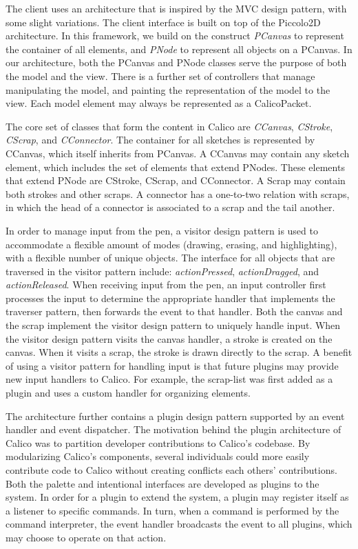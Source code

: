 \documentclass[12pt,fleqn]{ucithesis}
\begin{document}
The client uses an architecture that is inspired by the MVC design pattern, with some slight variations. The client interface is built on top of the Piccolo2D architecture. In this framework, we build on the construct \textit{PCanvas} to represent the container of all elements, and \textit{PNode} to represent all objects on a PCanvas. In our architecture, both the PCanvas and PNode classes serve the purpose of both the model and the view. There is a further set of controllers that manage manipulating the model, and painting the representation of the model to the view. Each model element may always be represented as a CalicoPacket. 

The core set of classes that form the content in Calico are \textit{CCanvas}, \textit{CStroke}, \textit{CScrap}, and \textit{CConnector}. The container for all sketches is represented by CCanvas, which itself inherits from PCanvas. A CCanvas may contain any sketch element, which includes the set of elements that extend PNodes. These elements that extend PNode are CStroke, CScrap, and CConnector. A Scrap may contain both strokes and other scraps. A connector has a one-to-two relation with scraps, in which the head of a connector is associated to a scrap and the tail another.

In order to manage input from the pen, a visitor design pattern is used to accommodate a flexible amount of modes (drawing, erasing, and highlighting), with a flexible number of unique objects. The interface for all objects that are traversed in the visitor pattern include: \textit{actionPressed}, \textit{actionDragged}, and \textit{actionReleased}. When receiving input from the pen, an input controller first processes the input to determine the appropriate handler that implements the traverser pattern, then forwards the event to that handler. Both the canvas and the scrap implement the visitor design pattern to uniquely handle input. When the visitor design pattern visits the canvas handler, a stroke is created on the canvas. When it visits a scrap, the stroke is drawn directly to the scrap. A benefit of using a visitor pattern for handling input is that future plugins may provide new input handlers to Calico. For example, the scrap-list was first added as a plugin and uses a custom handler for organizing elements.

The architecture further contains a plugin design pattern supported by an event handler and event dispatcher. The motivation behind the plugin architecture of Calico was to partition developer contributions to Calico's codebase. By modularizing Calico's components, several individuals could more easily contribute code to Calico without creating conflicts each others' contributions. Both the palette and intentional interfaces are developed as plugins to the system. In order for a plugin to extend the system, a plugin may register itself as a listener to specific commands. In turn, when a command is performed by the command interpreter, the event handler broadcasts the event to all plugins, which may choose to operate on that action.
\end{document}
